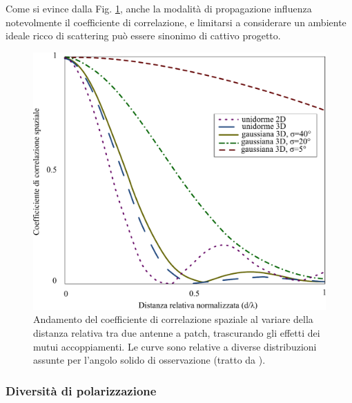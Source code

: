 \documentclass[technote]{IEEEtran}
\begin{document}
\par Come si evince dalla Fig. \ref{fig:20}, anche la modalità di propagazione influenza notevolmente il coefficiente di correlazione, e limitarsi a considerare un ambiente ideale ricco di scattering può essere sinonimo di cattivo progetto.
\begin{figure}[h]
\centering
\includegraphics[width=0.9\columnwidth]{figure20}
\caption{Andamento del coefficiente di correlazione spaziale al variare della distanza relativa tra due antenne a patch, trascurando gli effetti dei mutui accoppiamenti. Le curve sono relative a diverse distribuzioni assunte per l'angolo solido di osservazione (tratto da \cite{Ozdemir2004}).}
\label{fig:20}
\end{figure}

\subsubsection{Diversità  di polarizzazione}
\end{document}
